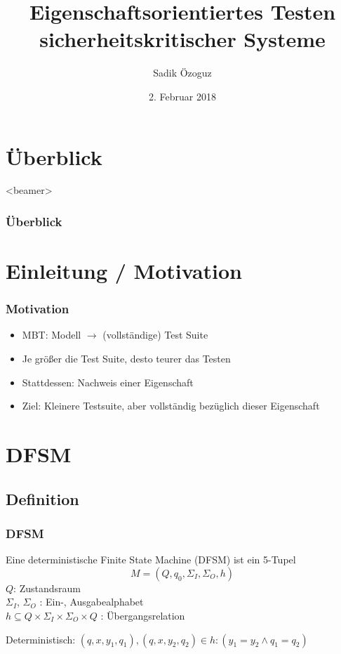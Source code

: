 \documentclass[10pt]{beamer}
\title{Eigenschaftsorientiertes Testen sicherheitskritischer Systeme}
\author{Sadik Özoguz}
\institute{Universit{\"a}t Bremen}
\date[02.02.2018]{2. Februar 2018}
\begin{document}
\begin{frame}
  \titlepage
\end{frame}

\section*{Überblick}
\begin{frame}<beamer>
  \frametitle{Überblick}
  \tableofcontents
\end{frame}

\section{Einleitung / Motivation}

\begin{frame}
  \frametitle{Motivation}
  \begin{itemize}
    \item MBT: Modell $\rightarrow$ (vollständige) Test Suite
    \item Je größer die Test Suite, desto teurer das Testen
    \item<2-> Stattdessen: Nachweis einer Eigenschaft
    \item<3-> Ziel: Kleinere Testsuite, aber vollständig bezüglich dieser Eigenschaft
  \end{itemize}
\end{frame}

\section{DFSM}
\subsection{Definition}
\begin{frame}
  \frametitle{DFSM}

  \begin{definition}
    Eine deterministische Finite State Machine (DFSM) ist ein 5-Tupel $$M=(Q,q_0,\Sigma_I,\Sigma_O,h)$$
    $Q$: Zustandsraum\\
    $\Sigma_I$, $\Sigma_O$ : Ein-, Ausgabealphabet\\
    $h \subseteq Q \times \Sigma_I \times \Sigma_O \times Q$ : Übergangsrelation 
  \end{definition}
  Deterministisch: $(q,x,y_1,q_1),(q,x,y_2,q_2) \in h: (y_1 = y_2 \wedge q_1 = q_2)$
\end{frame}
\end{document}

